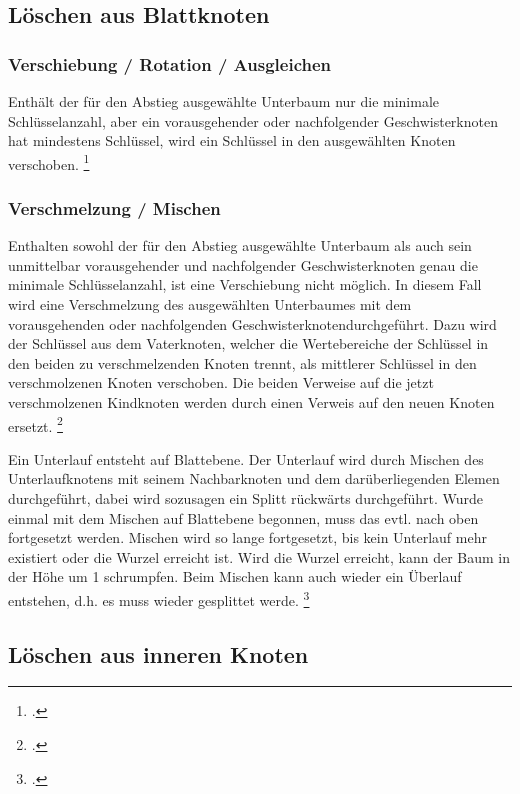 \documentclass{lehramt-informatik-haupt}
\begin{document}
\subsection{Löschen aus Blattknoten}

\subsubsection{Verschiebung / Rotation / Ausgleichen}

Enthält der für den Abstieg ausgewählte Unterbaum nur die minimale
Schlüsselanzahl, aber ein vorausgehender oder nachfolgender
Geschwisterknoten hat mindestens Schlüssel, wird ein Schlüssel in den
ausgewählten Knoten verschoben.
\footcite{wiki:bbaum}

\subsubsection{Verschmelzung / Mischen}

Enthalten sowohl der für den Abstieg ausgewählte Unterbaum  als auch
sein unmittelbar vorausgehender und nachfolgender Geschwisterknoten
genau die minimale Schlüsselanzahl, ist eine Verschiebung nicht möglich.
In diesem Fall wird eine Verschmelzung des ausgewählten Unterbaumes mit
dem vorausgehenden oder nachfolgenden Geschwisterknotendurchgeführt.
Dazu wird der Schlüssel aus dem Vaterknoten, welcher die Wertebereiche
der Schlüssel in den beiden zu verschmelzenden Knoten trennt, als
mittlerer Schlüssel in den verschmolzenen Knoten verschoben. Die beiden
Verweise auf die jetzt verschmolzenen Kindknoten werden durch einen
Verweis auf den neuen Knoten ersetzt.
\footcite{wiki:bbaum}

Ein Unterlauf entsteht auf Blattebene. Der Unterlauf wird durch Mischen
des Unterlaufknotens mit seinem Nachbarknoten und dem darüberliegenden
Elemen  durchgeführt, dabei wird sozusagen ein Splitt rückwärts
durchgeführt. Wurde einmal mit dem Mischen auf Blattebene begonnen, muss
das evtl. nach oben fortgesetzt werden. Mischen wird so lange
fortgesetzt, bis kein Unterlauf mehr existiert oder die Wurzel erreicht
ist. Wird die Wurzel erreicht, kann der Baum in der Höhe um 1
schrumpfen. Beim Mischen kann auch wieder ein Überlauf entstehen, d.h.
es muss wieder gesplittet werde.
\footcite[Seite 40]{aud:fs:5}

\subsection{Löschen aus inneren Knoten}
\end{document}
